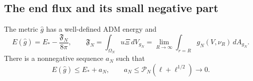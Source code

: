\subsection{The end flux and its small negative part}

\begin{lemma}\label{cp:mass-cost}
The metric $\widehat g$ has a well-defined ADM energy and
\begin{equation}\label{cp:mass-flux}
 E(\widehat g)=E_*-\frac{\mathfrak F_N}{8\pi},
 \qquad
 \mathfrak F_N=\int_{\Omega_N}u\Xi\,dV_{g_N}
 =\lim_{R\to\infty}\int_{r=R}g_N(V,\nu_R)\,dA_{g_N}.
\end{equation}
There is a nonnegative sequence $a_N$ such that
\begin{equation}\label{cp:mass-error}
 E(\widehat g)\le E_*+a_N,
 \qquad
 a_N\le\mathcal P_N(\ell+\ell^{1/2})\longrightarrow0.
\end{equation}
\end{lemma}

